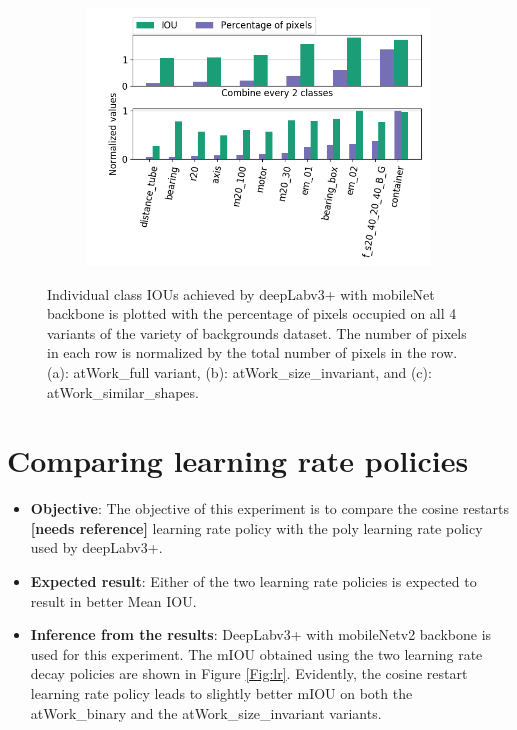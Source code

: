 \begin{figure}
\begin{subfigure}{.5\textwidth}
				\includegraphics[width=1\linewidth]{images/cls_iou_shape}
				\caption{}
				\label{Fig:clsiouc}
			\end{subfigure}
			\caption{Individual class IOUs achieved by deepLabv3+ with mobileNet backbone is plotted with the percentage of pixels occupied on all 4 variants of the variety of backgrounds dataset. The number of pixels in each row is normalized by the total number of pixels in the row. (a): atWork\_full variant, (b): atWork\_size\_invariant, and (c): atWork\_similar\_shapes.}
			\label{Fig:clsiou}
		\end{figure}

\section{Comparing learning rate policies}
	
	\begin{itemize}
		\item \textbf{Objective}: The objective of this experiment is to compare the cosine restarts \textbf{[needs reference]} learning rate policy with the poly learning rate policy used by deepLabv3+.
		\item \textbf{Expected result}: Either of the two learning rate policies is expected to result in better Mean IOU.
		\item \textbf{Inference from the results}: DeepLabv3+ with mobileNetv2 backbone is used for this experiment. The mIOU obtained using the two learning rate decay policies are shown in Figure \ref{Fig:lr}. Evidently, the cosine restart learning rate policy leads to slightly better mIOU on both the atWork\_binary and the atWork\_size\_invariant variants.
	\end{itemize}
	
